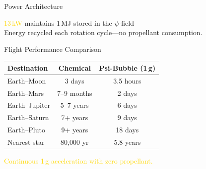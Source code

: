\documentclass[aspectratio=169,10pt]{beamer}
\begin{document}
\begin{frame}[t,fragile,shrink=5]{Power Architecture}
\vspace{0.3cm}
\begin{center}
\end{center}
\vspace{0.5cm}
\begin{center}
  \textcolor{gold}{\large 13\,kW} \small maintains 1\,MJ stored
  in the $\psi$-field\\[4pt]
  \small\textcolor{electricblue}{Energy recycled each rotation
    cycle---no propellant consumption.}
\end{center}
\end{frame}

\begin{frame}[t]{Flight Performance Comparison}
\vspace{0.3cm}
\begin{center}
\footnotesize
\begin{tabular}{l c c}
  \toprule
  \textbf{Destination} & \textbf{Chemical} & \textbf{Psi-Bubble (1\,g)} \\
  \midrule
  Earth--Moon    & 3 days      & 3.5 hours \\
  Earth--Mars    & 7--9 months & 2 days \\
  Earth--Jupiter & 5--7 years  & 6 days \\
  Earth--Saturn  & 7+ years    & 9 days \\
  Earth--Pluto   & 9+ years    & 18 days \\
  Nearest star   & 80,000 yr   & 5.8 years \\
  \bottomrule
\end{tabular}
\end{center}
\vspace{0.3cm}
\begin{center}
  \small\textcolor{gold}{Continuous 1\,g acceleration with zero propellant.}
\end{center}
\end{frame}
\end{document}
